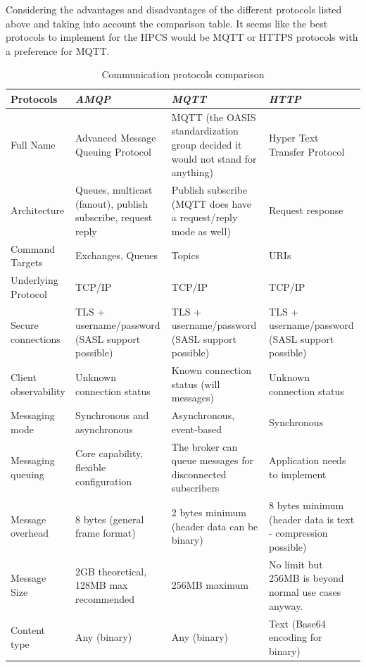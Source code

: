 Considering the advantages and disadvantages of the different protocols listed above and taking into account the comparison table. It seems like the best protocols to implement for the HPCS would be MQTT or HTTPS protocols with a preference for MQTT.

\newpage
\begin{table}[htbp]
    \caption{Communication protocols comparison}
    \begin{center}
    \renewcommand{\arraystretch}{2}
    \begin{tabular}{|p{3cm}|p{4.5cm}|p{4.5cm}|p{4.5cm}|}
    \hline
    \textbf{{Protocols}}& \textbf{\textit{AMQP}}& \textbf{\textit{MQTT}}& \textbf{\textit{HTTP}} \\
    \hline
    Full Name & Advanced Message Queuing Protocol & MQTT (the OASIS standardization group decided it would not stand for anything) & Hyper Text Transfer Protocol\\
    \hline
    Architecture & Queues, multicast (fanout), publish subscribe, request reply & Publish subscribe (MQTT does have a request/reply mode as well) & Request response\\
    \hline
    Command Targets & Exchanges, Queues & Topics & URIs\\
    \hline
    Underlying Protocol & TCP/IP & TCP/IP & TCP/IP\\
    \hline
    Secure connections & TLS + username/password (SASL support possible) & TLS + username/password (SASL support possible) & TLS + username/password (SASL support possible)\\
    \hline
    Client observability & Unknown connection status & Known connection status (will messages) & Unknown connection status\\
    \hline
    Messaging mode & Synchronous and asynchronous & Asynchronous, event-based & Synchronous\\
    \hline
    Messaging queuing & Core capability, flexible configuration & The broker can queue messages for disconnected subscribers & Application needs to implement\\
    \hline
    Message overhead & 8 bytes (general frame format) & 2 bytes minimum (header data can be binary) & 8 bytes minimum (header data is text - compression possible)\\
    \hline
    Message Size & 2GB theoretical, 128MB max recommended & 256MB maximum & No limit but 256MB is beyond normal use cases anyway.\\
    \hline
    Content type & Any (binary) & Any (binary) & Text (Base64 encoding for binary)\\

\end{tabular}
\end{center}
\end{table}
